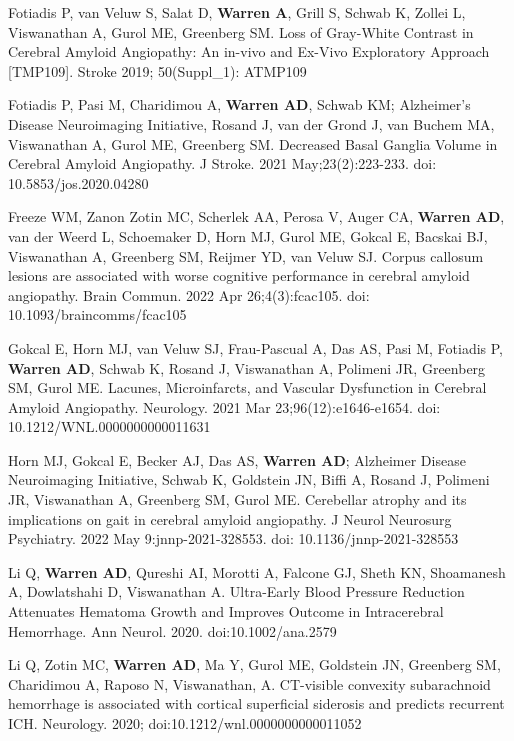\documentclass[10pt]{article} %
\begin{document}
\begin{thebibliography}{99}
 Fotiadis P, van Veluw S, Salat D, \textbf{Warren A}, Grill S, Schwab K, Zollei L, Viswanathan A, Gurol ME, Greenberg SM. Loss of Gray-White Contrast in Cerebral Amyloid Angiopathy: An in-vivo and Ex-Vivo Exploratory Approach [TMP109]. Stroke 2019; 50(Suppl\_1): ATMP109

 Fotiadis P, Pasi M, Charidimou A, \textbf{Warren AD}, Schwab KM; Alzheimer’s Disease Neuroimaging Initiative, Rosand J, van der Grond J, van Buchem MA, Viswanathan A, Gurol ME, Greenberg SM. Decreased Basal Ganglia Volume in Cerebral Amyloid Angiopathy. J Stroke. 2021 May;23(2):223-233. doi: 10.5853/jos.2020.04280

 Freeze WM, Zanon Zotin MC, Scherlek AA, Perosa V, Auger CA, \textbf{Warren AD}, van der Weerd L, Schoemaker D, Horn MJ, Gurol ME, Gokcal E, Bacskai BJ, Viswanathan A, Greenberg SM, Reijmer YD, van Veluw SJ. Corpus callosum lesions are associated with worse cognitive performance in cerebral amyloid angiopathy. Brain Commun. 2022 Apr 26;4(3):fcac105. doi: 10.1093/braincomms/fcac105

 Gokcal E, Horn MJ, van Veluw SJ, Frau-Pascual A, Das AS, Pasi M, Fotiadis P, \textbf{Warren AD}, Schwab K, Rosand J, Viswanathan A, Polimeni JR, Greenberg SM, Gurol ME. Lacunes, Microinfarcts, and Vascular Dysfunction in Cerebral Amyloid Angiopathy. Neurology. 2021 Mar 23;96(12):e1646-e1654. doi: 10.1212/WNL.0000000000011631

 Horn MJ, Gokcal E, Becker AJ, Das AS, \textbf{Warren AD}; Alzheimer Disease Neuroimaging Initiative, Schwab K, Goldstein JN, Biffi A, Rosand J, Polimeni JR, Viswanathan A, Greenberg SM, Gurol ME. Cerebellar atrophy and its implications on gait in cerebral amyloid angiopathy. J Neurol Neurosurg Psychiatry. 2022 May 9:jnnp-2021-328553. doi: 10.1136/jnnp-2021-328553

 Li Q, \textbf{Warren AD}, Qureshi AI, Morotti A, Falcone GJ, Sheth KN, Shoamanesh A, Dowlatshahi D, Viswanathan A. Ultra-Early Blood Pressure Reduction Attenuates Hematoma Growth and Improves Outcome in Intracerebral Hemorrhage. Ann Neurol. 2020. doi:10.1002/ana.2579

 Li Q, Zotin MC, \textbf{Warren AD}, Ma Y, Gurol ME, Goldstein JN, Greenberg SM, Charidimou A, Raposo N, Viswanathan, A. CT-visible convexity subarachnoid hemorrhage is associated with cortical superficial siderosis and predicts recurrent ICH. Neurology. 2020; doi:10.1212/wnl.0000000000011052


\end{thebibliography}
\end{document}

